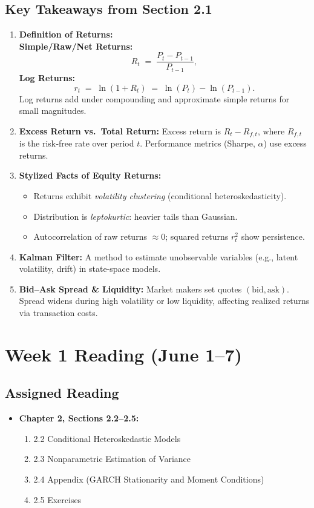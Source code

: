 \documentclass[11pt]{amsart}
\begin{document}
\subsection{Key Takeaways from Section 2.1}
\begin{enumerate}[noitemsep,left=0pt]
  \item \textbf{Definition of Returns:} \\
  \textbf{Simple/Raw/Net Returns:}
    \[
      R_t \;=\; \frac{P_t - P_{t-1}}{P_{t-1}}, 
    \]
    \textbf{Log Returns:}
    \[
      r_t \;=\; \ln(1 + R_t) \;=\; \ln(P_t) - \ln(P_{t-1}).
    \]
    Log returns add under compounding and approximate simple returns for small magnitudes.
  \item \textbf{Excess Return vs.\ Total Return:}  
    Excess return is $R_t - R_{f,t}$, where $R_{f,t}$ is the risk‐free rate over period $t$. Performance metrics (Sharpe, $\alpha$) use excess returns.
  \item \textbf{Stylized Facts of Equity Returns:}
    \begin{itemize}[noitemsep,left=2em]
      \item Returns exhibit \emph{volatility clustering} (conditional heteroskedasticity).
      \item Distribution is \emph{leptokurtic}: heavier tails than Gaussian.
      \item Autocorrelation of raw returns $\approx 0$; squared returns \( r_t^2 \) show persistence.
    \end{itemize}
  \item \textbf{Kalman Filter:}  
    A method to estimate unobservable variables (e.g., latent volatility, drift) in state‐space models.
  \item \textbf{Bid–Ask Spread \& Liquidity:}  
    Market makers set quotes $(\text{bid}, \text{ask})$. Spread widens during high volatility or low liquidity, affecting realized returns via transaction costs.
\end{enumerate}

\section{Week 1 Reading (June 1–7)}

\subsection{Assigned Reading}
\begin{itemize}[noitemsep,left=0pt]
  \item \textbf{Chapter 2, Sections 2.2–2.5:}
    \begin{enumerate}[noitemsep,left=1em]
      \item 2.2 Conditional Heteroskedastic Models
      \item 2.3 Nonparametric Estimation of Variance
      \item 2.4 Appendix (GARCH Stationarity and Moment Conditions)
      \item 2.5 Exercises
    \end{enumerate}
\end{itemize}
\end{document}
